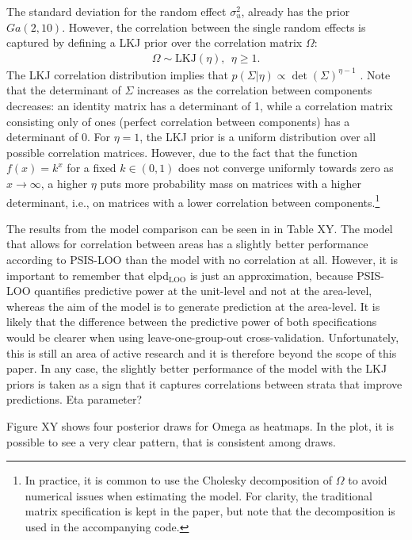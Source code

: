 The standard deviation for the random effect $\sigma_u^2$, already has the prior $Ga(2, 10)$.
However, the correlation between the single random effects is captured by defining a LKJ prior over the correlation matrix $\Omega$:
\begin{gather*}
    \Omega \sim \text{LKJ}(\eta), ~~ \eta \ge 1.
\end{gather*}
The LKJ correlation distribution implies that $p(\Sigma|\eta) \propto \det(\Sigma)^{\eta - 1}$ \citep[Chapter 1.13]{stan_development_team_stan_2021}.
Note that the determinant of $\Sigma$ increases as the correlation between components decreases:
an identity matrix has a determinant of 1, while a correlation matrix consisting only of ones (perfect correlation between components) has a determinant of 0.
For $\eta = 1$, the LKJ prior is a uniform distribution over all possible correlation matrices.
However, due to the fact that the function $f(x) = k^x$ for a fixed $k \in (0, 1)$ does not converge uniformly towards zero as $x \rightarrow \infty$, a higher $\eta$ puts more probability mass on matrices with a higher determinant, i.e., on matrices with a lower correlation between components.\footnote{In practice, it is common to use the Cholesky decomposition of $\Omega$ to avoid numerical issues when estimating the model.
For clarity, the traditional matrix specification is kept in the paper, but note that the decomposition is used in the accompanying code.}

The results from the model comparison can be seen in in Table XY.
The model that allows for correlation between areas has a slightly better performance according to PSIS-LOO than the model with no correlation at all.
However, it is important to remember that elpd$_{\text{LOO}}$ is just an approximation, because PSIS-LOO quantifies predictive power at the unit-level and not at the area-level, whereas the aim of the model is to generate prediction at the area-level.
It is likely that the difference between the predictive power of both specifications would be clearer when using leave-one-group-out cross-validation.
Unfortunately, this is still an area of active research and it is therefore beyond the scope of this paper.
In any case, the slightly better performance of the model with the LKJ priors is taken as a sign that it captures correlations between strata that improve predictions.
Eta parameter?

Figure XY shows four posterior draws for Omega as heatmaps. In the plot, it is possible to see a very clear pattern, that is consistent among draws.



